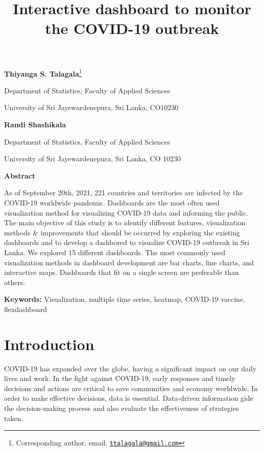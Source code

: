 \documentclass[
]{article}
\title{Interactive dashboard to monitor the COVID-19 outbreak}
\author{}
\date{\vspace{-2.5em}}
\begin{document}
\maketitle

\textbf{Thiyanga S. Talagala}\footnote{Corresponding author, email:
  \href{mailto:ttalagala@gmail.com}{\nolinkurl{ttalagala@gmail.com}}}

Department of Statistics, Faculty of Applied Sciences

University of Sri Jayewardenepura, Sri Lanka, CO10230

\hspace{3cm}

\textbf{Randi Shashikala}

Department of Statistics, Faculty of Applied Sciences

University of Sri Jayewardenepura, Sri Lanka, CO 10230

\hspace{3cm}

\textbf{Abstract}

As of September 20th, 2021, 221 countries and territories are infected
by the COVID-19 worldwide pandemic. Dashboards are the most often used
visualization method for visualizing COVID-19 data and informing the
public. The main objective of this study is to identify different
features, visualization methods \& improvements that should be occurred
by exploring the existing dashboards and to develop a dashbored to
visualize COVID-19 outbreak in Sri Lanka. We explored 15 different
dashboards. The most commonly used visualization methods in dashboard
development are bar charts, line charts, and interactive maps.
Dashboards that fit on a single screen are preferable than others.

\textbf{Keywords:} Visualization, multiple time series, heatmap,
COVID-19 vaccine, flexdashboard

\hypertarget{introduction}{%
\section{Introduction}\label{introduction}}

COVID-19 has expanded over the globe, having a significant impact on our
daily lives and work. In the fight against COVID-19, early responses and
timely decisions and actions are critical to save communities and
economy worldwide. In order to make effective decisions, data is
essential. Data-driven information gide the decision-making process and
also evaluate the effectiveness of strategies taken.
\end{document}
